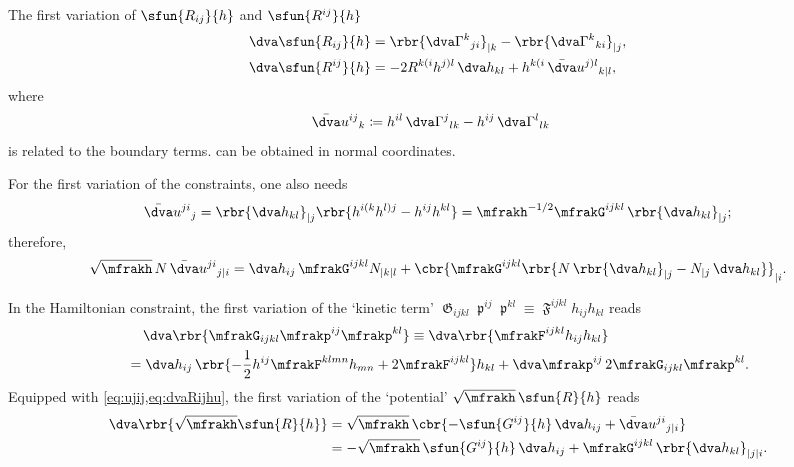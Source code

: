\documentclass[a4paper,11pt]{article}
\begin{document}
The first variation of $\sfun{R_{ij}}{h}$ and $\sfun{R^{ij}}{h}$
\begin{align}
\dva \sfun{R_{ij}}{h} &=
\rbr{\dva\Gamma^k{}_{ji}}_{|k} - \rbr{\dva\Gamma^k{}_{ki}}_{|j},
\label{eq:var-R_{ij}}
\\
\dva \sfun{R^{ij}}{h} &=
-2R^{k(i}h^{j)l}\,\dva h_{kl} + h^{k(i}\,\bar{\dva}u^{j)l}{}_{k|l},
\label{eq:dvaRijhu}
\end{align}
where
\begin{align}
\bar{\dva}u^{ij}{}_{k} &\coloneqq
h^{il}\,\dva\Gamma^{j}{}_{lk} - h^{ij}\,\dva\Gamma^{l}{}_{lk}
\end{align}
is related to the boundary terms.  can be obtained in normal 
coordinates.

For the first variation of the constraints, one also needs
\begin{align}
\bar{\dva}u^{ji}{}_{j} = \rbr{\dva h_{kl}}_{|j}
\rbr{h^{i(k}h^{l)j}-h^{ij}h^{kl}}
= \mfrakh^{-1/2}\mfrakG^{ijkl}\,\rbr{\dva h_{kl}}_{|j};
\label{eq:ujij}
\end{align}
therefore, 
\begin{align}
\sqrt{\mfrakh}\,N \,\bar{\dva}u^{ji}{}_{j|i} =
\dva h_{ij}\,\mfrakG^{ijkl}N_{|k|l}
+\cbr{\mfrakG^{ijkl}
\rbr{N\,\rbr{\dva h_{kl}}_{|j} - N_{|j}\,\dva h_{kl}} }_{|i}.
\end{align}

In the Hamiltonian constraint, the first variation of the `kinetic term'
$\mfrakG_{ijkl}\mfrakp^{ij}\mfrakp^{kl} \equiv
\mfrakF^{ijkl}h_{ij}h_{kl}$ reads
\begin{align}
&\quad\,\dva\rbr{ \mfrakG_{ijkl} \mfrakp^{ij}\mfrakp^{kl}}
\equiv \dva\rbr{\mfrakF^{ijkl}h_{ij}h_{kl}}
\nonumber \\
&=\dva h_{ij}\,\rbr{-\frac{1}{2} h^{ij} \mfrakF^{klmn} h_{mn}
+ 2 \mfrakF^{ijkl} } h_{kl} 
+\dva \mfrakp^{ij}\,2 \mfrakG_{ijkl}\mfrakp^{kl}.
\end{align}
Equipped with \cref{eq:ujij,eq:dvaRijhu}, the first variation of the `potential' 
$\sqrt{\mfrakh} \,\sfun{R}{h}$ reads
\begin{align}
\dva\rbr{\sqrt{\mfrakh}\sfun{R}{h}} &= \sqrt{\mfrakh}\,
\cbr{-\sfun{G^{ij}}{h}\,\dva h_{ij} +
\bar{\dva}u^{ji}{}_{j|i}}
\nonumber \\
&= -\sqrt{\mfrakh}\,\sfun{G^{ij}}{h}\,\dva h_{ij} +
\mfrakG^{ijkl}\,\rbr{\dva h_{kl}}_{|j|i}.
\end{align}
\end{document}
